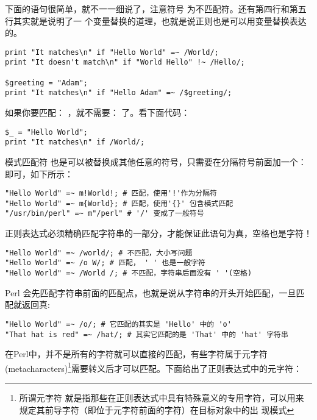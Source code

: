 \documentclass{article}
\begin{document}
下面的语句很简单，就不一一细说了，注意符号\code{{\color{blue}=~}} 为不匹配符。还有第四行和第五行其实就是说明了一
个变量替换的道理，也就是说正则也是可以用变量替换表达的。

\begin{verbatim}
print "It matches\n" if "Hello World" =~ /World/;
print "It doesn't match\n" if "World Hello" !~ /Hello/;

$greeting = "Adam";
print "It matches\n" if "Hello Adam" =~ /$greeting/;
\end{verbatim}

如果你要匹配：\code{{\color{blue}\$\_}} ，就不需要：\code{{\color{blue}\$\_ =~ }} 了。看下面代码：

\begin{verbatim}
$_ = "Hello World";
print "It matches\n" if /World/;
\end{verbatim}

模式匹配符 \code{{\color{blue}//}} 也是可以被替换成其他任意的符号，只需要在分隔符号前面加一个：
 即可，如下所示：

\begin{verbatim}
"Hello World" =~ m!World!; # 匹配，使用'!'作为分隔符
"Hello World" =~ m{World}; # 匹配，使用'{}' 包含模式匹配
"/usr/bin/perl" =~ m"/perl" # '/' 变成了一般符号
\end{verbatim}

正则表达式必须精确匹配字符串的一部分，才能保证此语句为真，空格也是字符！

\begin{verbatim}
"Hello World" =~ /world/; # 不匹配，大小写问题
"Hello World" =~ /o W/; # 匹配， ' ' 也是一般字符
"Hello World" =~ /World /; # 不匹配，字符串后面没有 ' '(空格)
\end{verbatim}

Perl 会先匹配字符串前面的匹配点，也就是说从字符串的开头开始匹配，一旦匹配就返回真:

\begin{verbatim}
"Hello World" =~ /o/; # 它匹配的其实是 'Hello' 中的 'o'
"That hat is red" =~ /hat/; # 其实它匹配的是 'That' 中的 'hat' 字符串
\end{verbatim}

在Perl中，并不是所有的字符就可以直接的匹配，有些字符属于{\color{blue}元字符}(metacharacters)\footnote{所谓元字符
就是指那些在正则表达式中具有特殊意义的专用字符，可以用来规定其前导字符（即位于元字符前面的字符）在目标对象中的出
现模式}需要转义后才可以匹配。下面给出了正则表达式中的元字符：
\end{document}
